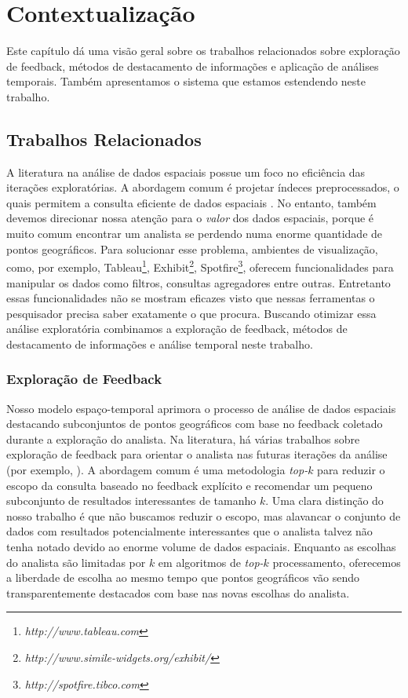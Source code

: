 \chapter{Contextualização}
\label{chap:contextualizacao}

Este capítulo dá uma visão geral sobre os trabalhos relacionados sobre exploração de feedback, métodos de destacamento de informações e aplicação de análises temporais. Também apresentamos o sistema que estamos estendendo neste trabalho.

\section{Trabalhos Relacionados}

A literatura na análise de dados espaciais possue um foco no eficiência das iterações exploratórias. A abordagem comum é projetar índeces preprocessados, o quais permitem a consulta eficiente de dados espaciais \cite{lins2013nanocubes}. No entanto, também devemos direcionar nossa atenção para o {\em valor} dos dados espaciais, porque é muito comum encontrar um analista se perdendo numa enorme quantidade de pontos geográficos. Para solucionar esse problema, ambientes de visualização, como, por exemplo, Tableau\footnote{\it http://www.tableau.com}, Exhibit\footnote{\it http://www.simile-widgets.org/exhibit/}, Spotfire\footnote{\it  http://spotfire.tibco.com}, oferecem funcionalidades para manipular os dados como filtros, consultas agregadores entre outras. Entretanto essas funcionalidades não se mostram eficazes visto que nessas ferramentas o pesquisador precisa saber exatamente o que procura. Buscando otimizar essa análise exploratória combinamos a exploração de feedback, métodos de destacamento de informações e análise temporal neste trabalho.

\subsection{Exploração de Feedback}

Nosso modelo espaço-temporal aprimora o processo de análise de dados espaciais destacando subconjuntos de pontos geográficos com base no feedback coletado durante a exploração do analista. Na literatura, há várias trabalhos sobre exploração de feedback para orientar o analista nas futuras iterações da análise (por exemplo, ). A abordagem comum é uma metodologia {\em top-$k$} para reduzir o escopo da consulta baseado no feedback explícito e recomendar um pequeno subconjunto de resultados interessantes de tamanho $k$. Uma clara distinção do nosso trabalho é que não buscamos reduzir o escopo, mas alavancar o conjunto de dados com resultados potencialmente interessantes que o analista talvez não tenha notado devido ao enorme volume de dados espaciais. Enquanto as escolhas do analista são limitadas por $k$ em algoritmos de {\em top-$k$} processamento, oferecemos a liberdade de escolha ao mesmo tempo que pontos geográficos vão sendo transparentemente destacados com base nas novas escolhas do analista.

